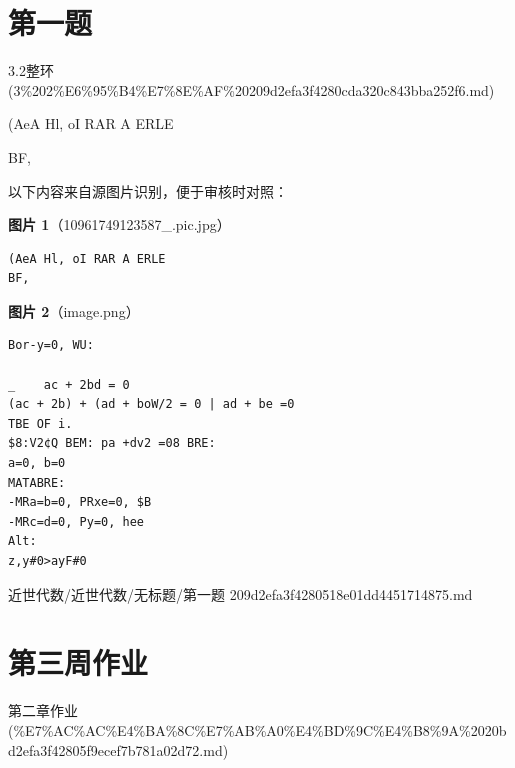 \section*{第一题}

\begin{note}[来源上级主题]

3.2整环 (3\%202\%E6\%95\%B4\%E7\%8E\%AF\%20209d2efa3f4280cda320c843bba252f6.md)

\end{note}

\begin{homework}

(AeA Hl, oI RAR A ERLE

BF,

\end{homework}

\begin{note}
以下内容来自源图片识别，便于审核时对照：

\textbf{图片 1}（10961749123587\_.pic.jpg）
\begin{Verbatim}[fontsize=\small]
(AeA Hl, oI RAR A ERLE
BF,
\end{Verbatim}

\textbf{图片 2}（image.png）
\begin{Verbatim}[fontsize=\small]
Bor-y=0, WU:

_    ac + 2bd = 0
(ac + 2b) + (ad + boW/2 = 0 | ad + be =0
TBE OF i.
$8:V2¢Q BEM: pa +dv2 =08 BRE:
a=0, b=0
MATABRE:
-MRa=b=0, PRxe=0, $B
-MRc=d=0, Py=0, hee
Alt:
z,y#0>ayF#0
\end{Verbatim}

\end{note}

\begin{note}[来源路径]

近世代数/近世代数/无标题/第一题 209d2efa3f4280518e01dd4451714875.md

\end{note}

\section*{第三周作业}

\begin{note}[来源上级主题]

第二章作业 (\%E7\%AC\%AC\%E4\%BA\%8C\%E7\%AB\%A0\%E4\%BD\%9C\%E4\%B8\%9A\%2020bd2efa3f42805f9ecef7b781a02d72.md)

\end{note}

